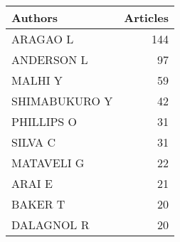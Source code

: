 
\begin{tabular}{lr}
\toprule
Authors & Articles\\
\midrule
ARAGAO L & 144\\
ANDERSON L & 97\\
MALHI Y & 59\\
SHIMABUKURO Y & 42\\
PHILLIPS O & 31\\
\addlinespace
SILVA C & 31\\
MATAVELI G & 22\\
ARAI E & 21\\
BAKER T & 20\\
DALAGNOL R & 20\\
\bottomrule
\end{tabular}